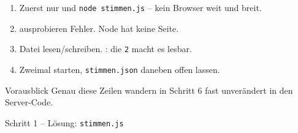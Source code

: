 \begin{lecturer}
\begin{frame}{}
  \footnotesize
  \begin{enumerate}
    \item Zuerst nur  und \texttt{node stimmen.js} -- kein Browser weit und breit.
    \item {} ausprobieren \textarrow{} Fehler. Node hat keine Seite.
    \item Datei lesen/schreiben. : die \texttt{2} macht es lesbar.
    \item Zweimal starten, \texttt{stimmen.json} daneben offen lassen.
  \end{enumerate}
  \begin{block}{Vorausblick}
    Genau diese Zeilen wandern in Schritt 6 fast unverändert in den Server-Code.
  \end{block}
\end{frame}
\end{lecturer}

\begin{loesung}
\begin{frame}[fragile]{Schritt 1 -- Lösung: \texttt{stimmen.js}}
\end{frame}
\end{loesung}

